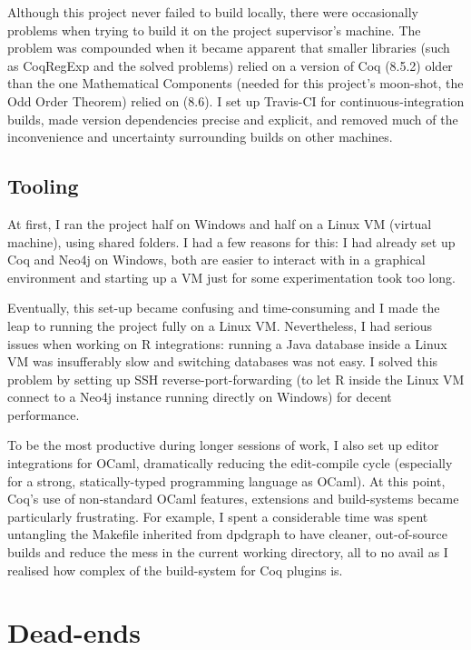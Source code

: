 Although this project never failed to build locally, there were occasionally
problems when trying to build it on the project supervisor's machine. The
problem was compounded when it became apparent that smaller libraries (such as
CoqRegExp and the solved problems) relied on a version of Coq (8.5.2) older than
the one Mathematical Components (needed for this project's moon-shot, the Odd
Order Theorem) relied on (8.6). I set up Travis-CI for continuous-integration
builds, made version dependencies precise and explicit, and removed much of the
inconvenience and uncertainty surrounding builds on other machines.

\subsection{Tooling}

At first, I ran the project half on Windows and half on a Linux VM (virtual
machine), using shared folders. I had a few reasons for this: I had already set
up Coq and Neo4j on Windows, both are easier to interact with in a graphical
environment and starting up a VM just for some experimentation took too long.

Eventually, this set-up became confusing and time-consuming and I made the leap
to running the project fully on a Linux VM. Nevertheless, I had serious issues
when working on R integrations: running a Java database inside a Linux VM was
insufferably slow and switching databases was not easy. I solved this problem by
setting up SSH reverse-port-forwarding (to let R inside the Linux VM connect to
a Neo4j instance running directly on Windows) for decent performance.

To be the most productive during longer sessions of work, I also set up editor
integrations for OCaml, dramatically reducing the edit-compile cycle (especially
for a strong, statically-typed programming language as OCaml). At this point,
Coq's use of non-standard OCaml features, extensions and build-systems became
particularly frustrating. For example, I spent a considerable time was spent
untangling the Makefile inherited from dpdgraph to have cleaner, out-of-source
builds and reduce the mess in the current working directory, all to no avail as
I realised how complex of the build-system for Coq plugins is.

\section{Dead-ends}

